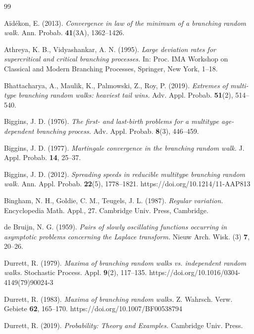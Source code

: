 \documentclass[12pt]{article}
\numberwithin{equation}{section}
\begin{document}
\begin{thebibliography}{99}

 

Aïdékon, E. (2013). \emph{Convergence in law of the minimum of a branching random walk.} Ann. Probab. \textbf{41}(3A), 1362–1426.


Athreya, K. B., Vidyashankar, A. N. (1995). \emph{Large deviation rates for supercritical and critical branching processes.} In: Proc. IMA Workshop on Classical and Modern Branching Processes, Springer, New York, 1–18.


Bhattacharya, A., Maulik, K., Palmowski, Z., Roy, P. (2019). \emph{Extremes of multi-type branching random walks: heaviest tail wins.} Adv. Appl. Probab. \textbf{51}(2), 514–540.



Biggins, J. D. (1976). \emph{The first- and last-birth problems for a multitype age-dependent branching process.} Adv. Appl. Probab. \textbf{8}(3), 446–459.

Biggins, J. D. (1977). \emph{Martingale convergence in the branching random walk.} J. Appl. Probab. \textbf{14}, 25–37.

Biggins, J. D. (2012). \emph{Spreading speeds in reducible multitype branching random walk.} Ann. Appl. Probab. \textbf{22}(5), 1778–1821. https://doi.org/10.1214/11-AAP813  

Bingham, N. H., Goldie, C. M., Teugels, J. L. (1987). \emph{Regular variation.} Encyclopedia Math. Appl., 27. Cambridge Univ. Press, Cambridge.  

de Bruijn, N. G. (1959). \emph{Pairs of slowly oscillating functions occurring in asymptotic problems concerning the Laplace transform.} Nieuw Arch. Wisk. (3) \textbf{7}, 20–26.


Durrett, R. (1979). \emph{Maxima of branching random walks vs. independent random walks.} Stochastic Process. Appl. \textbf{9}(2), 117–135. https://doi.org/10.1016/0304-4149(79)90024-3

Durrett, R. (1983). \emph{Maxima of branching random walks.} Z. Wahrsch. Verw. Gebiete \textbf{62}, 165–170. https://doi.org/10.1007/BF00538794  

Durrett, R. (2019). \emph{Probability: Theory and Examples.} Cambridge Univ. Press.  


\end{thebibliography}
\end{document}

